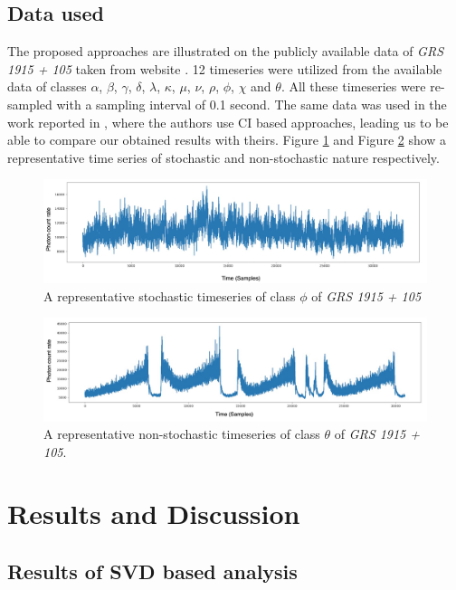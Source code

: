 \documentclass[10pt,conference]{IEEEtran}
\begin{document}
\subsection{Data used}
The proposed approaches are illustrated on the publicly available data of \textit{GRS 1915 + 105} taken from website \cite{rxte}. 12 timeseries were utilized from the available data  of classes $\alpha$, $\beta$, $\gamma$, $\delta$, $\lambda$, $\kappa$, $\mu$, $\nu$, $\rho$, $\phi$, $\chi$ and $\theta$. All these timeseries were re-sampled with a sampling interval of 0.1 second. The same data was  used in the work reported in \cite{Adegoke2018}, where the authors use CI based approaches, leading us to be able to compare our obtained results with theirs. Figure \ref{phi_ts} and Figure \ref{theta_ts} show a representative time series of stochastic and non-stochastic  nature respectively.

\begin{figure}[ht]
  \centering
  \includegraphics[width=0.9\linewidth]{phi_ts_edited.drawio.png}
  \caption{A representative stochastic timeseries of class $\phi$ of \textit{GRS 1915 + 105} }
  \label{phi_ts}
  \end{figure}

\begin{figure}[ht]
  \centering
  \includegraphics[width=0.8\linewidth]{theta_ts_edited.drawio.png}
  \caption{A representative non-stochastic timeseries of class $\theta$ of \textit{GRS 1915 + 105}. }
  \label{theta_ts}
\end{figure}

\section{Results and Discussion}

\subsection{Results of SVD based analysis}
\end{document}
